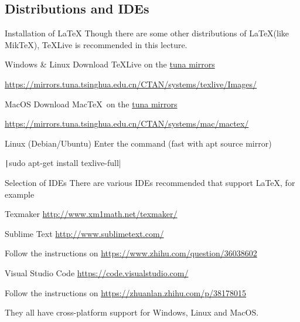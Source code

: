 \subsection{Distributions and IDEs}

\begin{frame}{Installation of \LaTeX}
	Though there are some other distributions of \LaTeX (like Mik\TeX), \TeX Live is recommended in this lecture.
	\begin{block}{Windows \& Linux}
		Download \TeX Live on the \href{https://mirrors.tuna.tsinghua.edu.cn/}{tuna mirrors}
		\smallskip
				
		\small{\url{https://mirrors.tuna.tsinghua.edu.cn/CTAN/systems/texlive/Images/}}
	\end{block}
	\begin{block}{MacOS}
		Download Mac\TeX\ on the \href{https://mirrors.tuna.tsinghua.edu.cn/}{tuna mirrors}		
		\smallskip
		
		\small{\url{https://mirrors.tuna.tsinghua.edu.cn/CTAN/systems/mac/mactex/}}
	\end{block}
	\begin{block}{Linux (Debian/Ubuntu)}
		Enter the command (fast with apt source mirror) 
		\smallskip
		
		\texttt|sudo apt-get install texlive-full|
	\end{block}
\end{frame}

\begin{frame}{Selection of IDEs}
	There are various IDEs recommended that support \LaTeX , for example
	\begin{block}{Texmaker}
		\url{http://www.xm1math.net/texmaker/}
	\end{block}
	 
	\begin{block}{Sublime Text}
		\url{http://www.sublimetext.com/}
	\end{block}
	Follow the instructions on \url{https://www.zhihu.com/question/36038602}
	
	\begin{block}{Visual Studio Code}
		\url{https://code.visualstudio.com/}
	\end{block}
	Follow the instructions on \url{https://zhuanlan.zhihu.com/p/38178015}
	\bigskip
	
	They all have cross-platform support for Windows, Linux and MacOS.
\end{frame}


